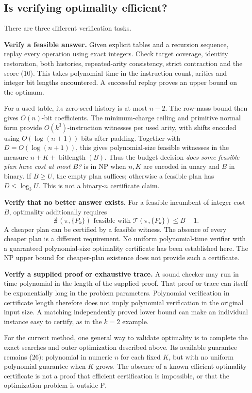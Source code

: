 \documentclass[11pt,letterpaper]{article}
\newcommand{\bits}{\operatorname{bitlength}}
\newcommand{\cost}{\mathcal T}
\begin{document}
\subsection{Is verifying optimality efficient?}\label{sec:verification}
There are three different verification tasks.

\textbf{Verify a feasible answer.} Given explicit tables and a recursion
sequence, replay every operation using exact integers. Check target
coverage, identity restoration, both histories, repeated-arity
consistency, strict contraction and the score (10).
This takes polynomial time in the instruction count, arities and
integer bit lengths encountered. A successful replay proves an upper
bound on the optimum.

For a used table, its zero-seed history is at most \(n-2\).
The row-mass bound then gives \(O(n)\)-bit coefficients. The
minimum-charge ceiling and primitive normal form provide
\(O(k^3)\)-instruction witnesses per used arity, with shifts encoded
using \(O(\log(n+1))\) bits after padding. Together with
\(D=O(\log(n+1))\), this gives polynomial-size feasible witnesses in the measure
\(n+K+\bits(B)\). Thus the budget decision
\emph{does some feasible plan have cost at most \(B\)?} is in NP
when \(n,K\) are encoded in unary and \(B\) in binary.
If \(B\ge U\), the empty plan suffices; otherwise a feasible
plan has \(D\le\log_3 U\). This is not a binary-\(n\) certificate claim.

\textbf{Verify that no better answer exists.} For a feasible incumbent
of integer cost \(B\), optimality additionally requires
\[
 \nexists\,(\pi,\{P_k\})\text{ feasible with }
 \cost(\pi,\{P_k\})\le B-1.
\]
A cheaper plan can be certified by a feasible witness. The absence
of every cheaper plan is a different requirement. No uniform
polynomial-time verifier with a guaranteed polynomial-size
optimality certificate has been established here. The NP upper
bound for cheaper-plan existence does not provide such a certificate.

\textbf{Verify a supplied proof or exhaustive trace.} A sound checker
may run in time polynomial in the length of the supplied proof.
That proof or trace can itself be exponentially long in the problem
parameters. Polynomial verification in certificate length therefore
does not imply polynomial verification in the original input size.
A matching independently proved lower bound can make an individual
instance easy to certify, as in the \(k=2\) example.

For the current method, one general way to validate optimality is to
complete the exact searches and outer optimization described above.
Its available guarantee remains (26): polynomial in numeric \(n\)
for each fixed \(K\), but with no uniform polynomial guarantee when
\(K\) grows. The absence of a known efficient
optimality certificate is not a proof that efficient certification is
impossible, or that the optimization problem is outside P.
\end{document}
